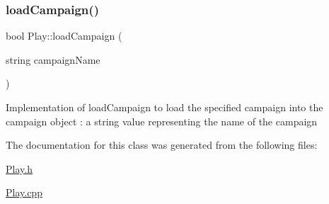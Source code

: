 \subsubsection{\texorpdfstring{load\+Campaign()}{loadCampaign()}}
{\footnotesize\ttfamily bool Play\+::load\+Campaign (\begin{DoxyParamCaption}\item[{string}]{campaign\+Name }\end{DoxyParamCaption})}

Implementation of load\+Campaign to load the specified campaign into the campaign object  \+: a string value representing the name of the campaign 

The documentation for this class was generated from the following files\+:\begin{DoxyCompactItemize}
\item 
\hyperlink{_play_8h}{Play.\+h}\item 
\hyperlink{_play_8cpp}{Play.\+cpp}\end{DoxyCompactItemize}
